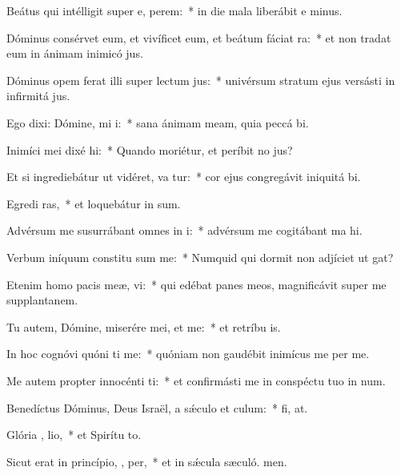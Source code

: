 \item Beátus qui intélligit super e,  perem:~* in die mala liberábit e minus.
\item Dóminus consérvet eum, et vivíficet eum, et beátum fáciat   ra:~* et non tradat eum in ánimam inimicó jus.
\item Dóminus opem ferat illi super lectum  jus:~* univérsum stratum ejus versásti in infirmitá jus.
\item Ego dixi: Dómine, mi i:~* sana ánimam meam, quia peccá bi.
\item Inimíci mei dixé  hi:~* Quando moriétur, et períbit no jus?
\item Et si ingrediebátur ut vidéret, va tur:~* cor ejus congregávit iniquitá bi.
\item Egredi ras,~* et loquebátur in sum.
\item Advérsum me susurrábant omnes in i:~* advérsum me cogitábant ma hi.
\item Verbum iníquum constitu sum me:~* Numquid qui dormit non adjíciet ut gat?
\item Etenim homo pacis meæ,   vi:~* qui edébat panes meos, magnificávit super me supplantanem.
\item Tu autem, Dómine, miserére mei, et  me:~* et retríbu is.
\item In hoc cognóvi quóni ti me:~* quóniam non gaudébit inimícus me per me.
\item Me autem propter innocénti ti:~* et confirmásti me in conspéctu tuo in num.
\item Benedíctus Dóminus, Deus Israël, a sǽculo et   culum:~* fi, at.
\item Glória ,  lio,~* et Spirítu to.
\item Sicut erat in princípio,  ,  per,~* et in sǽcula sæculó. men.
